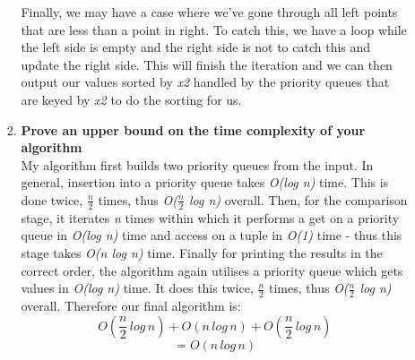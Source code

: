 \documentclass[11pt, oneside]{article}   	%
\begin{document}
\begin{enumerate}
\begin{enumerate}
\begin{enumerate}
			Finally, we may have a case where we've gone through all left points that are less than a point in right. To catch this, we have a loop while the left side is empty and the right side is not to catch this and update the right side. This will finish the iteration and we can then output our values sorted by \textit{x2} handled by the priority queues that are keyed by \textit{x2} to do the sorting for us.
			
			\item \textbf{Prove an upper bound on the time complexity of your algorithm}\\
			My algorithm first builds two priority queues from the input. In general, insertion into a priority queue takes \textit{O(log n)} time. This is done twice, $\frac{n}{2}$ times, thus \textit{O($\frac{n}{2}$ log n)} overall. Then, for the comparison stage, it iterates \textit{n} times within which it performs a get on a priority queue in \textit{O(log n)} time and access on a tuple in \textit{O(1)} time - thus this stage takes \textit{O(n log n)} time. Finally for printing the results in the correct order, the algorithm again utilises a priority queue which gets values in \textit{O(log n)} time. It does this twice, $\frac{n}{2}$ times, thus \textit{O($\frac{n}{2}$ log n)} overall. Therefore our final algorithm is:
		\[ O(\frac{n}{2}\, log\, n) + O(n\, log\, n) + O(\frac{n}{2}\, log\, n) \]
		\[ = O( n\, log\, n ) \]

		\end{enumerate}
		

\end{enumerate}
\end{enumerate}
\end{document}
